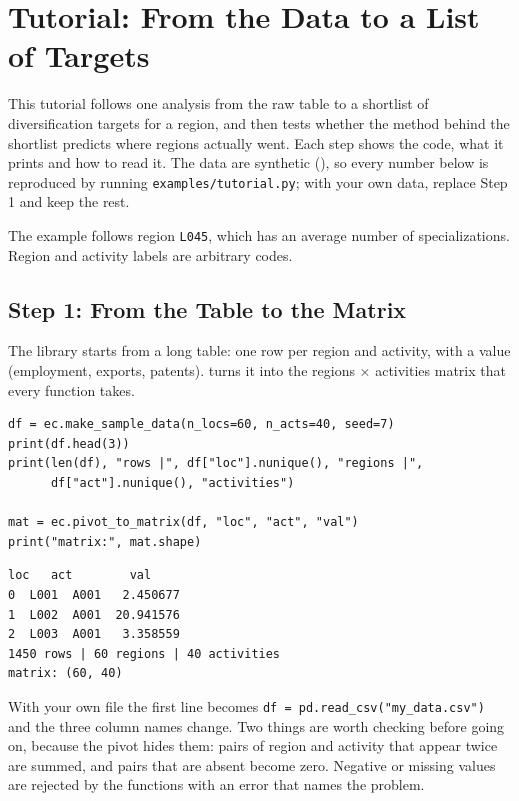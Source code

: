 \section{Tutorial: From the Data to a List of Targets}

This tutorial follows one analysis from the raw table to a shortlist
of diversification targets for a region, and then tests whether the
method behind the shortlist predicts where regions actually went. Each
step shows the code, what it prints and how to read it. The data are
synthetic (), so every number below is reproduced
by running \texttt{examples/tutorial.py}; with your own data, replace
Step 1 and keep the rest.

The example follows region \texttt{L045}, which has an average number of
specializations. Region and activity labels are arbitrary codes.

\subsection{Step 1: From the Table to the Matrix}

The library starts from a long table: one row per region and
activity, with a value (employment, exports, patents).
 turns it into the regions $\times$ activities
matrix that every function takes.

\begin{lstlisting}
df = ec.make_sample_data(n_locs=60, n_acts=40, seed=7)
print(df.head(3))
print(len(df), "rows |", df["loc"].nunique(), "regions |",
      df["act"].nunique(), "activities")

mat = ec.pivot_to_matrix(df, "loc", "act", "val")
print("matrix:", mat.shape)
\end{lstlisting}
\begin{lstlisting}[language={}, numbers=none, backgroundcolor=\color{white}, frame=leftline, framerule=2pt, rulecolor=\color{noteborder}, xleftmargin=1.5em]
    loc   act        val
0  L001  A001   2.450677
1  L002  A001  20.941576
2  L003  A001   3.358559
1450 rows | 60 regions | 40 activities
matrix: (60, 40)
\end{lstlisting}

With your own file the first line becomes
\texttt{df = pd.read\_csv("my\_data.csv")} and the three column names
change. Two things are worth checking before going on, because the
pivot hides them: pairs of region and activity that appear twice are
summed, and pairs that are absent become zero. Negative or missing
values are rejected by the functions with an error that names the
problem.

